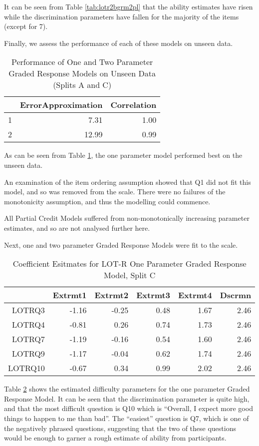 \documentclass{article}
\begin{document}
It can be seen from Table \ref{tab:lotr2bgrm2pl} that the ability estimates have risen while the discrimination parameters have fallen for the majority of the items (except for 7). 


Finally, we assess the performance of each of these models on unseen data. 

\begin{table}[ht]
\centering
\begin{tabular}{rrr}
  \hline
 & ErrorApproximation & Correlation \\ 
  \hline
1 & 7.31 & 1.00 \\ 
  2 & 12.99 & 0.99 \\ 
   \hline
\end{tabular}
\caption{Performance of One and Two Parameter Graded Response Models on Unseen Data (Splits A and C)} 
\label{tab:lotr2bgrmtest}
\end{table}
As can be seen from Table \ref{tab:lotr2bgrmtest}, the one parameter model performed best on the unseen data. 



An examination of the item ordering assumption showed that Q1 did not fit this model, and so was removed from the scale. There were no failures of the monotonicity assumption, and thus the modelling could commence. 


All Partial Credit Models suffered from non-monotonically increasing parameter estimates, and so are not analysed further here. 

Next, one and two parameter Graded Response Models were fit to the scale.


\begin{table}[ht]
\centering
\begin{tabular}{rrrrrr}
  \hline
 & Extrmt1 & Extrmt2 & Extrmt3 & Extrmt4 & Dscrmn \\ 
  \hline
LOTRQ3 & -1.16 & -0.25 & 0.48 & 1.67 & 2.46 \\ 
  LOTRQ4 & -0.81 & 0.26 & 0.74 & 1.73 & 2.46 \\ 
  LOTRQ7 & -1.19 & -0.16 & 0.54 & 1.60 & 2.46 \\ 
  LOTRQ9 & -1.17 & -0.04 & 0.62 & 1.74 & 2.46 \\ 
  LOTRQ10 & -0.67 & 0.34 & 0.99 & 2.02 & 2.46 \\ 
   \hline
\end{tabular}
\caption{Coefficient Esitmates for LOT-R One Parameter Graded Response Model, Split C} 
\label{tab:lotr2cgrm1pl}
\end{table}
Table \ref{tab:lotr2cgrm1pl} shows the estimated difficulty parameters for the one parameter Graded Response Model. It can be seen that the discrimination parameter is quite high, and that the most difficult question is Q10 which is ``Overall, I expect more good things to happen to me than bad''. The ``easiest'' question is Q7, which is one of the negatively phrased questions, suggesting that the two of these questions would be enough to garner a rough estimate of ability from participants. 
\end{document}
